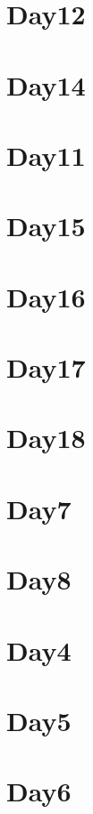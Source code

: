 
\section*{Day12}

\vfill
\section*{Day14}

\vfill
\section*{Day11}

\vfill
\section*{Day15}

\vfill
\section*{Day16}

\vfill
\section*{Day17}

\vfill
\section*{Day18}

\vfill
\section*{Day7}

\vfill
\section*{Day8}

\vfill
\section*{Day4}

\vfill
\section*{Day5}

\vfill
\section*{Day6}

\vfill
